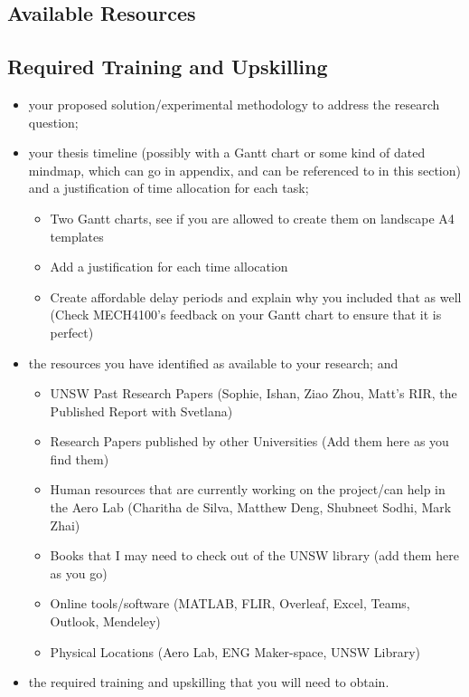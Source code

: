 \subsection{Available Resources}

\subsection{Required Training and Upskilling}

\begin{itemize}
    \item your proposed solution/experimental methodology to address the research question;
    \item your thesis timeline (possibly with a Gantt chart or some kind of dated mindmap, which can go in appendix, and can be referenced to in this section) and a justification of time allocation for each task;
    \begin{itemize}
        \item Two Gantt charts, see if you are allowed to create them on landscape A4 templates
        \item Add a justification for each time allocation
        \item Create affordable delay periods and explain why you included that as well (Check MECH4100's feedback on your Gantt chart to ensure that it is perfect)
    \end{itemize}
    \item the resources you have identified as available to your research; and
    \begin{itemize}
        \item UNSW Past Research Papers (Sophie, Ishan, Ziao Zhou, Matt's RIR, the Published Report with Svetlana)
        \item Research Papers published by other Universities (Add them here as you find them)
        \item Human resources that are currently working on the project/can help in the Aero Lab (Charitha de Silva, Matthew Deng, Shubneet Sodhi, Mark Zhai)
        \item Books that I may need to check out of the UNSW library (add them here as you go)
        \item Online tools/software (MATLAB, FLIR, Overleaf, Excel, Teams, Outlook, Mendeley)
        \item Physical Locations (Aero Lab, ENG Maker-space, UNSW Library)
    \end{itemize}
    \item the required training and upskilling that you will need to obtain.

\end{itemize}
